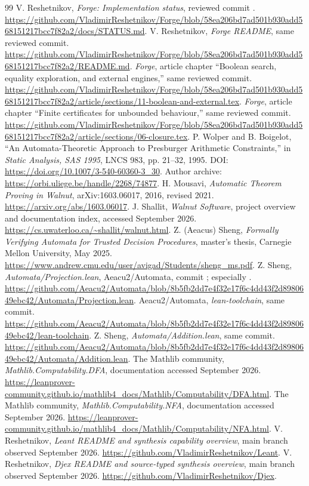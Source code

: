 \begin{thebibliography}{99}
\small
{} V. Reshetnikov, \emph{Forge: Implementation status}, reviewed commit . \url{https://github.com/VladimirReshetnikov/Forge/blob/58ea206bd7ad501b930add568151217bcc7f82a2/docs/STATUS.md}.
 V. Reshetnikov, \emph{Forge README}, same reviewed commit. \url{https://github.com/VladimirReshetnikov/Forge/blob/58ea206bd7ad501b930add568151217bcc7f82a2/README.md}.
 \emph{Forge}, article chapter ``Boolean search, equality exploration, and external engines,'' same reviewed commit. \url{https://github.com/VladimirReshetnikov/Forge/blob/58ea206bd7ad501b930add568151217bcc7f82a2/article/sections/11-boolean-and-external.tex}.
 \emph{Forge}, article chapter ``Finite certificates for unbounded behaviour,'' same reviewed commit. \url{https://github.com/VladimirReshetnikov/Forge/blob/58ea206bd7ad501b930add568151217bcc7f82a2/article/sections/06-closure.tex}.
 P. Wolper and B. Boigelot, ``An Automata-Theoretic Approach to Presburger Arithmetic Constraints,'' in \emph{Static Analysis, SAS 1995}, LNCS 983, pp. 21--32, 1995. DOI: \url{https://doi.org/10.1007/3-540-60360-3_30}. Author archive: \url{https://orbi.uliege.be/handle/2268/74877}.
 H. Mousavi, \emph{Automatic Theorem Proving in Walnut}, arXiv:1603.06017, 2016, revised 2021. \url{https://arxiv.org/abs/1603.06017}.
 J. Shallit, \emph{Walnut Software}, project overview and documentation index, accessed September 2026. \url{https://cs.uwaterloo.ca/~shallit/walnut.html}.
 Z. (Aeacus) Sheng, \emph{Formally Verifying Automata for Trusted Decision Procedures}, master's thesis, Carnegie Mellon University, May 2025. \url{https://www.andrew.cmu.edu/user/avigad/Students/sheng_ms.pdf}.
 Z. Sheng, \emph{Automata/Projection.lean}, Aeacu2/Automata, commit ; especially . \url{https://github.com/Aeacu2/Automata/blob/8b5fb2dd7e4f32e17f6c4dd43f2d8980649ebc42/Automata/Projection.lean}.
 Aeacu2/Automata, \emph{lean-toolchain}, same commit. \url{https://github.com/Aeacu2/Automata/blob/8b5fb2dd7e4f32e17f6c4dd43f2d8980649ebc42/lean-toolchain}.
 Z. Sheng, \emph{Automata/Addition.lean}, same commit. \url{https://github.com/Aeacu2/Automata/blob/8b5fb2dd7e4f32e17f6c4dd43f2d8980649ebc42/Automata/Addition.lean}.
 The Mathlib community, \emph{Mathlib.Computability.DFA}, documentation accessed September 2026. \url{https://leanprover-community.github.io/mathlib4_docs/Mathlib/Computability/DFA.html}.
 The Mathlib community, \emph{Mathlib.Computability.NFA}, documentation accessed September 2026. \url{https://leanprover-community.github.io/mathlib4_docs/Mathlib/Computability/NFA.html}.
 V. Reshetnikov, \emph{Leant README and synthesis capability overview}, main branch observed September 2026. \url{https://github.com/VladimirReshetnikov/Leant}.
 V. Reshetnikov, \emph{Djex README and source-typed synthesis overview}, main branch observed September 2026. \url{https://github.com/VladimirReshetnikov/Djex}.
\end{thebibliography}
